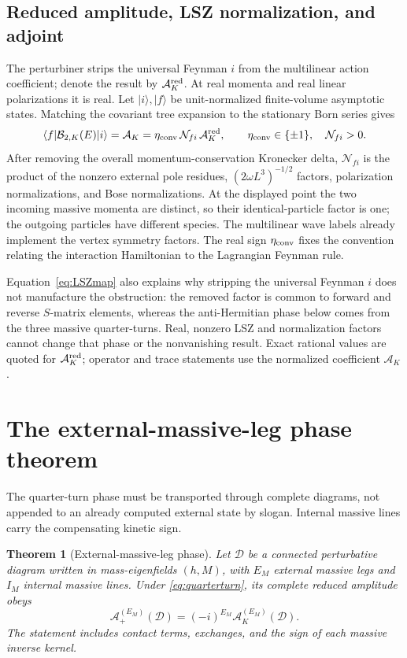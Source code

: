 \documentclass[11pt]{article}
\newtheorem{theorem}{Theorem}[section]
\theoremstyle{definition}
\theoremstyle{remark}
\newcommand{\AK}{\mathcal A_K}
\newcommand{\AKred}{\mathcal A_K^{\rm red}}
\newcommand{\Born}{\mathcal B}
\begin{document}
\subsection{Reduced amplitude, LSZ normalization, and adjoint}

The perturbiner strips the universal Feynman $i$ from the multilinear
action coefficient; denote the result by $\AKred$.  At real momenta and
real linear polarizations it is real.  Let $|i\rangle,|f\rangle$ be
unit-normalized finite-volume asymptotic states.  Matching the covariant
tree expansion to the stationary Born series gives
\begin{equation}\label{eq:LSZmap}
\langle f|\Born_{2,K}(E)|i\rangle
=\AK=\eta_{\rm conv}\,\mathcal N_{fi}\,\AKred,
\qquad \eta_{\rm conv}\in\{\pm1\},\quad \mathcal N_{fi}>0.
\end{equation}
After removing the overall momentum-conservation Kronecker delta,
$\mathcal N_{fi}$ is the product of the nonzero external pole
residues, $(2\omega L^3)^{-1/2}$ factors, polarization normalizations,
and Bose normalizations.  At the displayed point the two incoming
massive momenta are distinct, so their identical-particle factor is one;
the outgoing particles have different species.  The multilinear wave
labels already implement the vertex symmetry factors.  The real sign
$\eta_{\rm conv}$ fixes the convention relating the interaction
Hamiltonian to the Lagrangian Feynman rule.

Equation~\eqref{eq:LSZmap} also explains why stripping the universal
Feynman $i$ does not manufacture the obstruction: the removed factor is
common to forward and reverse $S$-matrix elements, whereas the
anti-Hermitian phase below comes from the three massive quarter-turns.
Real, nonzero LSZ and normalization factors cannot change that phase or
the nonvanishing result.  Exact rational values are quoted for
$\AKred$; operator and trace statements use the normalized coefficient
$\AK$.

\section{The external-massive-leg phase theorem}\label{sec:phase}

The quarter-turn phase must be transported through complete diagrams,
not appended to an already computed external state by slogan.  Internal
massive lines carry the compensating kinetic sign.

\begin{theorem}[External-massive-leg phase]\label{thm:phase}
Let $\mathcal D$ be a connected perturbative diagram written in
mass-eigenfields $(h,M)$, with $E_M$ external massive legs and $I_M$
internal massive lines.  Under \eqref{eq:quarterturn}, its complete
reduced amplitude obeys
\begin{equation}\label{eq:phasetheorem}
\mathcal A_+^{(E_M)}(\mathcal D)
=(-i)^{E_M}\mathcal A_K^{(E_M)}(\mathcal D).
\end{equation}
The statement includes contact terms, exchanges, and the sign of each
massive inverse kernel.
\end{theorem}
\end{document}
